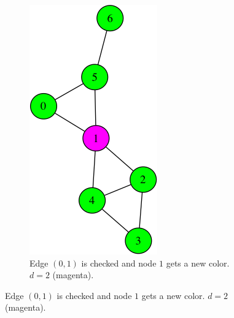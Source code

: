 \begin{figure}
\begin{subfigure}{0.20\textwidth}
\end{subfigure}
\hspace*{\fill} %
\begin{subfigure}{0.20\textwidth}
\includegraphics[width=\linewidth]{images/coloring/1.png}
\caption{Edge $(0,1)$ is checked and node $1$ gets a new color. $d=2$ (magenta).} \label{fig:coloring1}

\end{subfigure}
\end{figure}
